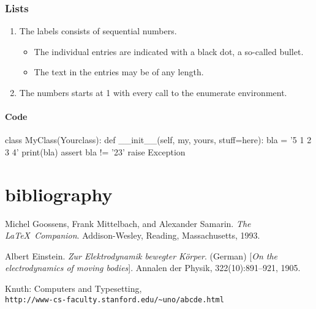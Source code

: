 \documentclass{article}
\begin{document}
\subsubsection{Lists}
\begin{enumerate}
   \item The labels consists of sequential numbers.
   \begin{itemize}
     \item The individual entries are indicated with a black dot, a so-called bullet.
     \item The text in the entries may be of any length.
   \end{itemize}
   \item The numbers starts at 1 with every call to the enumerate environment.
\end{enumerate}
\paragraph{Code}

\begin{python}
class MyClass(Yourclass):
    def __init__(self, my, yours, stuff=here):
        bla = '5 1 2 3 4'
        print(bla)
        assert bla != '23'
        raise Exception
\end{python}

\newpage




\section{bibliography}

\begin{thebibliography}{9}
Michel Goossens, Frank Mittelbach, and Alexander Samarin. 
\textit{The \LaTeX\ Companion}. 
Addison-Wesley, Reading, Massachusetts, 1993.
 
Albert Einstein. 
\textit{Zur Elektrodynamik bewegter K{\"o}rper}. (German) 
[\textit{On the electrodynamics of moving bodies}]. 
Annalen der Physik, 322(10):891–921, 1905.
 
Knuth: Computers and Typesetting,
\\\texttt{http://www-cs-faculty.stanford.edu/\~{}uno/abcde.html}
\end{thebibliography}
\end{document}
